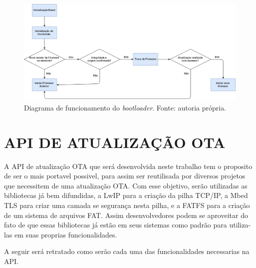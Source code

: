 \begin{figure}[H]
    \scriptsize
     \centering
     \includegraphics[scale=0.39]{dados/figuras/DiagramaBootloader.png}
     \caption{Diagrama de funcionamento do \textit{bootloader}. Fonte: autoria própria.}
     \label{Diagrama Bootloader}
\end{figure}




\section{API DE ATUALIZAÇÃO OTA}
\label{sec:API}

A API de atualização OTA que será desenvolvida neste trabalho tem o proposito de ser o mais portavel possivel, para assim ser reutilisada por diversos projetos que necessitem de uma atualização OTA. Com esse objetivo, serão utilizadas as bibliotecas já bem difundidas, a LwIP para a criação da pilha TCP/IP, a Mbed TLS para criar uma camada se segurança nesta pilha, e a FATFS para a criação de um sistema de arquivos FAT. Assim desenvolvedores podem se aproveitar do fato de que essas bibliotecas já estão em seus sistemas como padrão para utiliza-las em suas proprias funcionalidades. 

A seguir será retratado como serão cada uma das funcionalidades necessarias na API.

